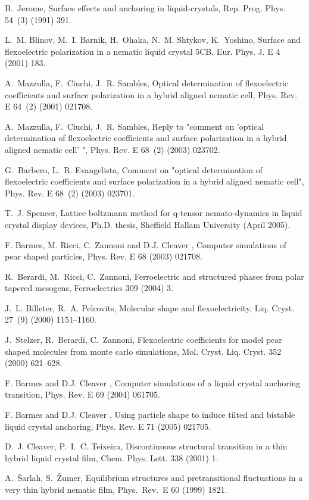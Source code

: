 \documentclass[aps,10pt,twocolumn]{revtex4}
\begin{document}
\begin{thebibliography}{10}
B.~Jerome, Surface effects and anchoring in liquid-crystals, Rep. Prog. Phys.
  54~(3) (1991) 391.

L.~M. Blinov, M.~I. Barnik, H.~Ohaka, N.~M. Shtykov, K.~Yoshino, {Surface and
  flexoelectric polarization in a nematic liquid crystal 5CB}, Eur. Phys. J. E
  4 (2001) 183.

A.~Mazzulla, F.~Ciuchi, J.~R. Sambles, Optical determination of flexoelectric
  coefficients and surface polarization in a hybrid aligned nematic cell, Phys.
  Rev. E 64~(2) (2001) 021708.

A.~Mazzulla, F.~Ciuchi, J.~R. Sambles, Reply to "comment on 'optical
  determination of flexoelectric coefficients and surface polarization in a
  hybrid aligned nematic cell' ", Phys. Rev. E 68~(2) (2003) 023702.

G.~Barbero, L.~R. Evangelista, Comment on "optical determination of
  flexoelectric coefficients and surface polarization in a hybrid aligned
  nematic cell", Phys. Rev. E 68~(2) (2003) 023701.

T.~J. Spencer, Lattice boltzmann method for q-tensor nemato-dynamics in liquid
  crystal display devices, Ph.D. thesis, Sheffield Hallam University (April
  2005).

{F. Barmes, M. Ricci, C. Zannoni and D.J. Cleaver }, Computer simulations of
  pear shaped particles, Phys. Rev. E 68 (2003) 021708.

R.~Berardi, M.~Ricci, C.~Zannoni, Ferroelectric and structured phases from
  polar tapered mesogens, Ferroelectrics 309 (2004) 3.

J.~L. Billeter, R.~A. Pelcovits, Molecular shape and flexoelectricity, Liq.
  Cryst. 27~(9) (2000) 1151--1160.

J.~Stelzer, R.~Berardi, C.~Zannoni, Flexoelectric coefficients for model pear
  shaped molecules from monte carlo simulations, Mol. Cryst. Liq. Cryst. 352
  (2000) 621--628.

{F. Barmes and D.J. Cleaver }, {Computer simulations of a liquid crystal
  anchoring transition}, Phys. Rev. E 69 (2004) 061705.

{F. Barmes and D.J. Cleaver }, {Using particle shape to induce tilted and
  bistable liquid crystal anchoring}, Phys. Rev. E 71 (2005) 021705.

D.~J. Cleaver, P.~I.~C. Teixeira, Discontinuous structural transition in a thin
  hybrid liquid crystal film, Chem. Phys. Lett. 338 (2001) 1.

A.~\v{S}arlah, S.~\v{Z}umer, Equilibrium structures and pretransitional
  fluctuations in a very thin hybrid nematic film, Phys.\ Rev.\ E 60 (1999)
  1821.

\end{thebibliography}
\end{document}
